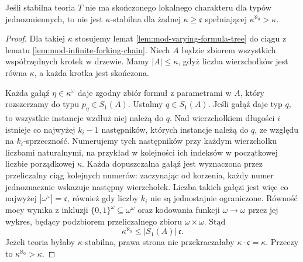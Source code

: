 \begin{twierdzenie}
\label{thm:mod-infinite-forking-lower}
Jeśli stabilna teoria $T$ nie ma
skończonego lokalnego charakteru dla
typów jednozmiennych, to nie jest
$\kappa$-stabilna dla żadnej
$\kappa\geq\mathfrak c$ spełniającej
$\kappa^{\aleph_0}>\kappa$.
\end{twierdzenie}
\begin{proof}
Dla takiej $\kappa$ stosujemy lemat
\ref{lem:mod-varying-formula-tree}
do ciągu z lematu
\ref{lem:mod-infinite-forking-chain}.
Niech $A$ będzie zbiorem wszystkich
współrzędnych krotek w drzewie.
Mamy $|A|\leq\kappa$, gdyż liczba
wierzchołków jest równa $\kappa$,
a każda krotka jest skończona.

Każda gałąź $\eta\in\kappa^\omega$
daje zgodny zbiór formuł z parametrami
w $A$, który rozszerzamy do typu
$p_\eta\in S_1(A)$.
Ustalmy $q\in S_1(A)$.
Jeśli gałąź daje typ $q$, to wszystkie
instancje wzdłuż niej należą do $q$.
Nad wierzchołkiem długości $i$ istnieje
co najwyżej $k_i-1$ następników,
których instancje należą do $q$,
ze względu na $k_i$-sprzeczność.
Numerujemy tych następników przy
każdym wierzchołku liczbami naturalnymi,
na przykład w kolejności ich indeksów
w początkowej liczbie porządkowej $\kappa$.
Każda dopuszczalna gałąź jest wyznaczona
przez przeliczalny ciąg kolejnych numerów:
zaczynając od korzenia, każdy numer
jednoznacznie wskazuje następny wierzchołek.
Liczba takich gałęzi jest więc
co najwyżej $|\omega^\omega|=\mathfrak c$,
również gdy liczby $k_i$ nie są
jednostajnie ograniczone. Równość mocy wynika
z inkluzji $\{0,1\}^\omega\subseteq\omega^\omega$
oraz kodowania funkcji $\omega\to\omega$ przez
jej wykres, będący podzbiorem przeliczalnego
zbioru $\omega\times\omega$.
Stąd
\[
\kappa^{\aleph_0}\leq|S_1(A)|\,\mathfrak c.
\]
Jeżeli teoria byłaby $\kappa$-stabilna,
prawa strona nie przekraczałaby
$\kappa\cdot\mathfrak c=\kappa$.
Przeczy to $\kappa^{\aleph_0}>\kappa$.
\end{proof}

